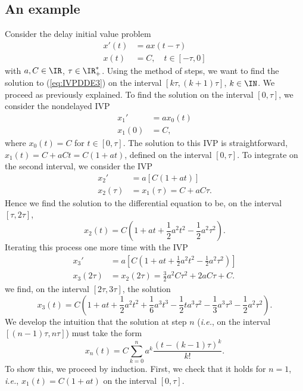 \subsection{An example}
Consider the delay initial value problem
\begin{equation}\label{eq:IVPDDE3}
\begin{aligned}
x'(t) &= a x(t-\tau) \\
x(t) &= C, \quad t\in[-\tau,0]
\end{aligned}
\end{equation}
with $a,C\in\IR$, $\tau\in\IR_+^*$. 
Using the method of steps, we want to find the solution to
(\ref{eq:IVPDDE3}) on the interval $[k\tau,(k+1)\tau]$,
$k\in\IN$. 
We proceed as previously explained. 
To find the solution on the interval $[0,\tau]$, we consider the
nondelayed IVP 
\begin{align*}
x_1'&= ax_0(t) \\
x_1(0)&= C,
\end{align*}
where $x_0(t)=C$ for $t\in[0,\tau]$. The solution to this IVP is
straightforward, $x_1(t)=C+aCt=C(1+at)$, defined on the interval
$[0,\tau]$. To integrate on the second interval, we consider
the IVP 
\begin{align*}
x_2'&= a[C(1+at)] \\
x_2(\tau)&= x_1(\tau)=C+aC\tau.
\end{align*}
Hence we find the solution to the differential equation to be, on the
interval $[\tau,2\tau]$,
\[
x_2(t)=C\left(1+at+\frac{1}{2}a^2t^2-\frac{1}{2}a^2\tau^2\right).
\]
Iterating this process one more time with the IVP
\begin{align*}
x_3'&= a\left[
C\left(1+at+\frac{1}{2}a^2t^2-\frac{1}{2}a^2\tau^2\right)
\right] \\
x_3(2\tau)&= x_2(2\tau)=\frac{3}{2}a^2C\tau^2+2aC\tau+C.
\end{align*}
we find, on the interval $[2\tau,3\tau]$, the solution
\[
x_3(t)=C
\left(1+at+\frac{1}{2}a^2t^2+\frac{1}{6}a^3t^3
-\frac{1}{2}ta^3\tau^2-\frac{1}{3}a^3\tau^3
-\frac{1}{2}a^2\tau^2\right).
\]
We develop the intuition that the solution at step $n$ (\emph{i.e.},
on the interval $[(n-1)\tau,n\tau]$) must take the form
\begin{equation}\label{eq:sol2}
x_{n}(t)=
C\sum_{k=0}^n a^k \frac{(t-(k-1)\tau)^k}{k!}.
\end{equation}
To show this, we proceed by induction. First, we check that it holds
for $n=1$, \emph{i.e.}, $x_1(t)=C(1+at)$ on the interval $[0,\tau]$.
